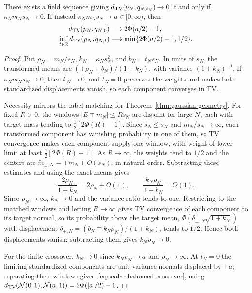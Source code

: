 \begin{proposition}
\label{prop:scalar-gaussian}
There exists a field sequence giving $d_{\mathrm{TV}}(p_N,q_{N,t_N})\to0$ if and
only if $\kappa_Nm_Ns_N\to0$. If instead
$\kappa_Nm_Ns_N\to a\in[0,\infty)$, then
\begin{align}
 d_{\mathrm{TV}}(p_N,q_{N,0})&\longrightarrow2\Phi(a/2)-1,
 \label{eq:scalar-balanced-crossover}\\
 \inf_{t\in\mathbb R}d_{\mathrm{TV}}(p_N,q_{N,t})
       &\longrightarrow\min\{2\Phi(a/2)-1,1/2\}.
 \label{eq:scalar-optimal-crossover}
\end{align}
\end{proposition}
\begin{proof}
Put $\rho_N=m_N/s_N$, $k_N=\kappa_Ns_N^2$, and $b_N=t_Ns_N$.
In units of $s_N$, the transformed means are
$(\pm\rho_N+b_N)/(1+k_N)$, with variance $(1+k_N)^{-1}$.
If $\kappa_Nm_Ns_N\to0$, then $k_N\to0$, and $t_N=0$ preserves the
weights and makes both standardized displacements vanish, so
each component converges in TV.

Necessity mirrors the label matching for
Theorem~\ref{thm:gaussian-geometry}. For fixed $R>0$, the windows
$|E\mp m_N|\le Rs_N$ are disjoint for large $N$, each with target mass
tending to $\tfrac12[2\Phi(R)-1]$. Since $\widetilde s_N\le s_N$ and
$m_N/s_N\to\infty$, each transformed component has vanishing
probability in one of them, so TV convergence makes each component
supply one window, with weight of lower limit at least
$\tfrac12[2\Phi(R)-1]$. As $R\to\infty$, the weights tend to $1/2$
and the centers are $\widetilde m_{\pm,N}=\pm m_N+O(s_N)$, in natural
order. Subtracting these estimates and using the exact means gives
\[
 \frac{2\rho_N}{1+k_N}=2\rho_N+O(1),\qquad
 \frac{k_N\rho_N}{1+k_N}=O(1).
\]
Since $\rho_N\to\infty$, $k_N\to0$ and the variance ratio tends to one.
Restricting to the matched windows and letting $R\to\infty$
gives TV convergence of each component to its target normal, so
its probability above the target mean,
$\Phi(\delta_{\pm,N}\sqrt{1+k_N})$ with displacement
$\delta_{\pm,N}=(b_N\mp k_N\rho_N)/(1+k_N)$, tends to $1/2$. Hence
both displacements vanish; subtracting them gives $k_N\rho_N\to0$.

For the finite crossover, $k_N\to0$ since $k_N\rho_N\to a$ and
$\rho_N\to\infty$. At $t_N=0$ the limiting standardized components are
unit-variance normals displaced by $\mp a$; separating their windows
gives~\eqref{eq:scalar-balanced-crossover}, using
$d_{\mathrm{TV}}(\mathcal N(0,1),\mathcal N(a,1))=2\Phi(|a|/2)-1$.


\end{proof}
